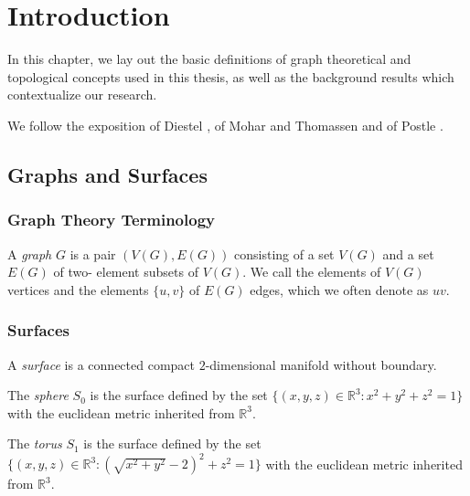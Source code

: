 \chapter{Introduction}

In this chapter, we lay out the basic definitions of graph theoretical and topological concepts used in this thesis, as well as the background results which contextualize our research.

We follow the exposition of Diestel \cite{diestel}, of Mohar and Thomassen \cite{graphsonsurfaces}
and of Postle \cite{postlethesis}. 

\section{Graphs and Surfaces}


\subsection{Graph Theory Terminology}

\begin{definition}
A \emph{graph} $G$ is a pair $(V(G), E(G))$ consisting of a set $V(G)$ and a set $E(G)$ of two-
element subsets of $V(G)$. We call the elements of $V(G)$ vertices and
the elements $\{u, v\}$ of $E(G)$ edges, which we often denote as $uv$.
\end{definition}




\subsection{Surfaces}

\begin{definition}
A \emph{surface} is a connected compact $2$-dimensional manifold without boundary. 
\end{definition}

\begin{example}
The \emph{sphere} $S_0$ is the surface defined by the set $\{(x, y, z) \in \mathbb{R}^3 : x^2+y^2
+z^2 = 1\}$ with the euclidean metric inherited from $\mathbb{R}^3$. 

The \emph{torus} $S_1$ is the surface defined by the set $\{(x, y, z) \in \mathbb{R}^3 :  (\sqrt{x^2 + y^2} - 2)^2 + z^2 = 1\}$ with the euclidean metric inherited from $\mathbb{R}^3$.
\end{example}

